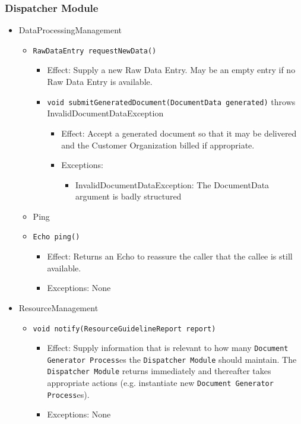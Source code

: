 \documentclass[a4paper,10pt]{article}
\begin{document}
\subsubsection*{Dispatcher Module}
\begin{itemize}
    \item DataProcessingManagement
    \begin{itemize}
        \item \texttt{RawDataEntry requestNewData()}
        \begin{itemize}
            \item Effect: Supply a new Raw Data Entry. May be an empty entry if no Raw Data Entry is available.

        \item \texttt{void submitGeneratedDocument(DocumentData generated)} throws InvalidDocumentDataException
        \begin{itemize}
            \item Effect: Accept a generated document so that it may be delivered and the Customer Organization billed if appropriate.
            \item Exceptions:
            \begin{itemize}
            	\item InvalidDocumentDataException: The DocumentData argument is badly structured
            \end{itemize}
         \end{itemize}
    \end{itemize}
\end{itemize}

\begin{itemize}
	\item Ping
		\item \texttt{Echo ping()}
		\begin{itemize}
			\item Effect: Returns an Echo to reassure the caller that the callee is still available. 
			\item Exceptions: None
		\end{itemize}
	\end{itemize}
\end{itemize}

\begin{itemize}
	\item ResourceManagement
	\begin{itemize}
		\item \texttt{void notify(ResourceGuidelineReport report)}
		\begin{itemize}
			\item Effect: Supply information that is relevant to how many \texttt{Document Generator Process}es the \texttt{Dispatcher Module} should maintain. The \texttt{Dispatcher Module} returns immediately and thereafter takes appropriate actions (e.g. instantiate new \texttt{Document Generator Process}es).
			\item Exceptions: None
		\end{itemize}
	\end{itemize}
\end{itemize}
\end{document}
